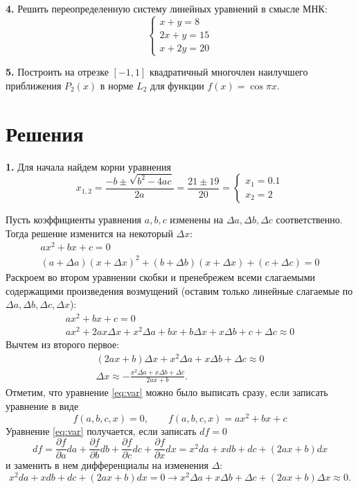 \documentclass[12pt]{article}
\newcommand{\pd}[2]{\frac{\partial #1}{\partial #2}}
\begin{document}
\textbf{4.} Решить переопределенную систему линейных уравнений в смысле МНК:
\[
\begin{cases}
x + y = 8\\
2x + y = 15\\
x + 2y = 20
\end{cases}
\]

\textbf{5.} Построить на отрезке $[-1, 1]$ квадратичный многочлен наилучшего приближения $P_2(x)$ в норме $L_2$ для функции $f(x) = \cos \pi x$.

\newpage
\section{Решения}
\textbf{1.}
Для начала найдем корни уравнения 
\[
x_{1,2} = \frac{-b \pm \sqrt{b^2 - 4ac}}{2a} = 
\frac{21 \pm 19}{20} =
\begin{cases}
x_1 = 0.1\\x_2 = 2
\end{cases}
\]

Пусть коэффициенты уравнения $a,b,c$ изменены на $\Delta a, \Delta b, \Delta c$ соответственно. Тогда решение изменится на некоторый $\Delta x$:
\begin{gather*}
ax^2 + bx + c = 0\\
(a + \Delta a)(x + \Delta x)^2 + (b + \Delta b)(x + \Delta x) + (c + \Delta c) = 0
\end{gather*}
Раскроем во втором уравнении скобки и пренебрежем всеми слагаемыми содержащими произведения возмущений (оставим только линейные слагаемые по $\Delta a, \Delta b, \Delta c, \Delta x$):
\begin{gather*}
ax^2 + bx + c = 0\\
a x^2 + 2ax \Delta x + x^2 \Delta a + b x + b \Delta x + x \Delta b + c + \Delta c \approx 0
\end{gather*}
Вычтем из второго первое:
\begin{gather}
(2ax + b)\Delta x + x^2 \Delta a + x \Delta b + \Delta c \approx 0\label{eq:var}\\
\Delta x \approx -\frac{x^2 \Delta a + x \Delta b + \Delta c}{2ax+b}\label{eq:ans}.
\end{gather}
Отметим, что уравнение \eqref{eq:var} можно было выписать сразу, если записать уравнение в виде
\[
f(a, b, c, x) = 0, \qquad f(a, b, c, x) = ax^2 + bx + c
\]
Уравнение \eqref{eq:var} получается, если записать $df = 0$
\[
df = \pd{f}{a} da + \pd{f}{b} db + \pd{f}{c} dc + \pd{f}{x} dx = x^2 da + x db + dc + (2ax + b)dx
\]
и заменить в нем дифференциалы на изменения $\Delta$:
\[
x^2 da + x db + dc + (2ax + b)dx = 0 \longrightarrow
x^2 \Delta a + x \Delta b + \Delta c + (2ax + b)\Delta x \approx 0.
\]
\end{document}
